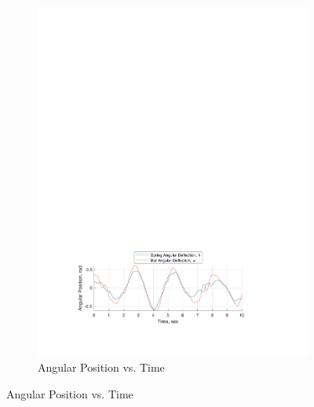 \documentclass[12pt]{report}
\begin{document}
\begin{flushleft}
\begin{figure}[!ht]
\begin{subfigure}[t]{\textwidth}
  \includegraphics[center]{angles_18-9}
  \caption{Angular Position vs. Time}
  \label{fig:angles:18-9}
\end{subfigure}
\end{figure}
\null
\begin{figure}[!ht]
\caption{Numerical Solution Motion Behavior Plot, ($\theta_o:~\sfrac{\pi}{6},~\phi_o:~\sfrac{\pi}{3}$)}
\begin{subfigure}[t]{\textwidth}

\end{subfigure}
\end{figure}
\end{flushleft}
\end{document}
